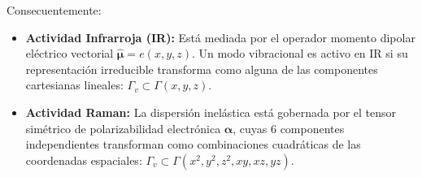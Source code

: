 Consecuentemente:
\begin{itemize}
    \item \textbf{Actividad Infrarroja (IR):} Está mediada por el operador momento dipolar eléctrico vectorial $\hat{\bm{\mu}} = e(x, y, z)$. Un modo vibracional es activo en IR si su representación irreducible transforma como alguna de las componentes cartesianas lineales: $\Gamma_v \subset \Gamma(x, y, z)$.
    \item \textbf{Actividad Raman:} La dispersión inelástica está gobernada por el tensor simétrico de polarizabilidad electrónica $\bm{\alpha}$, cuyas 6 componentes independientes transforman como combinaciones cuadráticas de las coordenadas espaciales: $\Gamma_v \subset \Gamma(x^2, y^2, z^2, xy, xz, yz)$.
\end{itemize}
